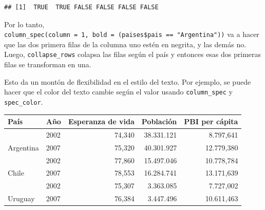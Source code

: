 \documentclass[
  openany]{book}
\newenvironment{Shaded}{\begin{snugshade}}{\end{snugshade}}
\newcommand{\AttributeTok}[1]{\textcolor[rgb]{0.77,0.63,0.00}{#1}}
\newcommand{\DecValTok}[1]{\textcolor[rgb]{0.00,0.00,0.81}{#1}}
\newcommand{\FunctionTok}[1]{\textcolor[rgb]{0.00,0.00,0.00}{#1}}
\newcommand{\NormalTok}[1]{#1}
\newcommand{\SpecialCharTok}[1]{\textcolor[rgb]{0.00,0.00,0.00}{#1}}
\newcommand{\StringTok}[1]{\textcolor[rgb]{0.31,0.60,0.02}{#1}}
\begin{document}
\begin{verbatim}
## [1]  TRUE  TRUE FALSE FALSE FALSE FALSE
\end{verbatim}

Por lo tanto, \texttt{column\_spec(column\ =\ 1,\ bold\ =\ (paises\$pais\ ==\ "Argentina"))} va a hacer que las dos primera filas de la columna uno estén en negrita, y las demás no.
Luego, \texttt{collapse\_rows} colapsa las filas según el país y entonces esas dos primeras filas se transforman en una.

Esto da un montón de flexibilidad en el estilo del texto.
Por ejemplo, se puede hacer que el color del texto cambie según el valor usando \texttt{column\_spec} y \texttt{spec\_color}.

\begin{Shaded}
\end{Shaded}

\begin{table}
\centering
\begin{tabular}{l|l|>{}r|r|r}
\hline
País & Año & Esperanza de vida & Población & PBI per cápita\\
\hline
 & 2002 & \textcolor[HTML]{440154}{74,340} & 38.331.121 & 8.797,641\\
\cline{2-5}
\multirow[t]{-2}{*}{\raggedright\arraybackslash Argentina} & 2007 & \textcolor[HTML]{3D4D8A}{75,320} & 40.301.927 & 12.779,380\\
\cline{1-5}
 & 2002 & \textcolor[HTML]{90D743}{77,860} & 15.497.046 & 10.778,784\\
\cline{2-5}
\multirow[t]{-2}{*}{\raggedright\arraybackslash Chile} & 2007 & \textcolor[HTML]{FDE725}{78,553} & 16.284.741 & 13.171,639\\
\cline{1-5}
 & 2002 & \textcolor[HTML]{3D4D8A}{75,307} & 3.363.085 & 7.727,002\\
\cline{2-5}
\multirow[t]{-2}{*}{\raggedright\arraybackslash Uruguay} & 2007 & \textcolor[HTML]{228D8D}{76,384} & 3.447.496 & 10.611,463\\
\hline
\end{tabular}
\end{table}
\end{document}
